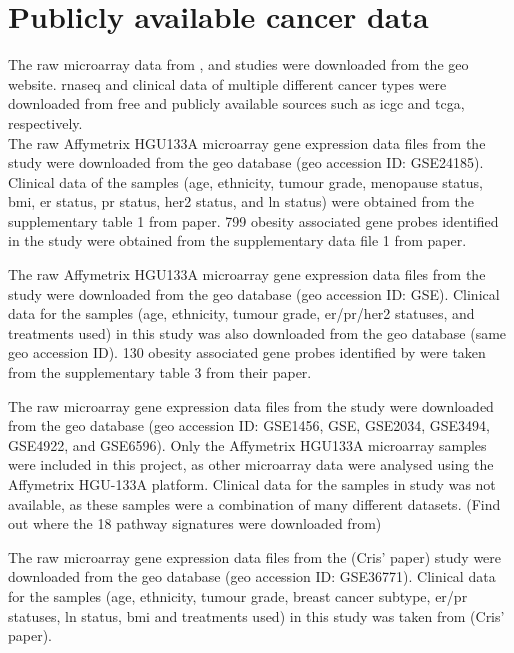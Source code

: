 \section{Publicly available cancer data}
\label{sec:data}

The raw microarray data from \citet{Creighton2012}, \citet{Fuentes-Mattei2014} and \citet{Gatza2010a}  studies were downloaded from the \gls{geo} website.
\gls{rnaseq} and clinical data of multiple different cancer types were downloaded from free and publicly available sources such as \gls{icgc} and \gls{tcga}, respectively.
\\

\noindent
The raw Affymetrix HGU\-133A microarray gene expression data files from the \citet{Creighton2012} study were downloaded from the \gls{geo} database (\gls{geo} accession ID: GSE24185).
Clinical data of the samples (age, ethnicity, tumour grade, menopause status, \gls{bmi}, \gls{er} status, \gls{pr} status, \gls{her2} status, and \gls{ln} status) were obtained from the supplementary table 1 from \citet{Creighton2012} paper.
799 obesity associated gene probes identified in the \citet{Creighton2012} study were obtained from the supplementary data file 1 from \citet{Creighton2012} paper.

The raw Affymetrix HGU\-133A microarray gene expression data files from the  \citet{Fuentes-Mattei2014} study were downloaded from the \gls{geo} database (\gls{geo} accession ID: GSE).
Clinical data for the samples (age, ethnicity, tumour grade, \gls{er}/\gls{pr}/\gls{her2} statuses, and treatments used) in this study was also downloaded from the \gls{geo} database (same \gls{geo} accession ID).
130 obesity associated gene probes identified by \citet{Fuentes-Mattei2014} were taken from the supplementary table 3 from their paper.

The raw microarray gene expression data files from the \citet{Gatza2010a} study were downloaded from the \gls{geo} database (\gls{geo} accession ID: GSE1456, GSE, GSE2034, GSE3494, GSE4922, and GSE6596).
Only the Affymetrix HGU\-133A microarray samples were included in this project, as other microarray data were analysed using the Affymetrix HGU-133A platform.
Clinical data for the samples in \citet{Gatza2010a} study was not available, as these samples were a combination of many different datasets.
(Find out where the 18 pathway signatures were downloaded from)


The raw microarray gene expression data files from the (Cris' paper) study were downloaded from the \gls{geo} database (\gls{geo} accession ID: GSE36771).
Clinical data for the samples (age, ethnicity, tumour grade, breast cancer subtype, \gls{er}/\gls{pr} statuses, \gls{ln} status, \gls{bmi} and treatments used) in this study was taken from (Cris' paper).
\\

